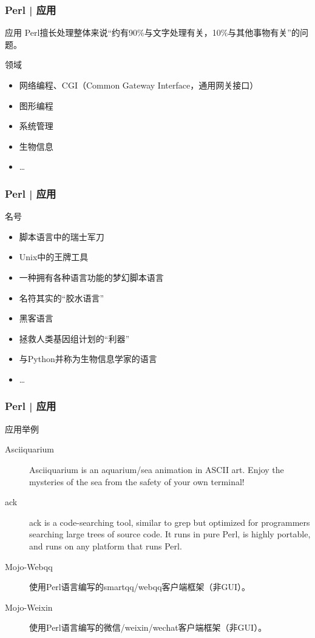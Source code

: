 \begin{frame}
  \frametitle{Perl | 应用}
  \begin{block}{应用}
    Perl擅长处理整体来说“约有90\%与文字处理有关，10\%与其他事物有关”的问题。 
  \end{block}
  \begin{block}{领域}
    \begin{itemize}
      \item 网络编程、CGI（Common Gateway Interface，通用网关接口）
      \item 图形编程
      \item 系统管理
      \item 生物信息
      \item \ldots
    \end{itemize}
  \end{block}
\end{frame}

\begin{frame}
  \frametitle{Perl | 应用}
  \begin{block}{名号}
    \begin{itemize}
      \item 脚本语言中的瑞士军刀
      \item Unix中的王牌工具
      \item 一种拥有各种语言功能的梦幻脚本语言
      \item 名符其实的“胶水语言”
      \item 黑客语言
      \item 拯救人类基因组计划的“利器”
      \item 与Python并称为生物信息学家的语言
      \item \ldots
    \end{itemize}
  \end{block}
\end{frame}

\begin{frame}
  \frametitle{Perl | 应用}
  \begin{block}{应用举例}
    \begin{description}
      \item[\alert{Asciiquarium}] Asciiquarium is an aquarium/sea animation in ASCII art. Enjoy the mysteries of the sea from the safety of your own terminal! 
      \item[\alert{ack}] ack is a code-searching tool, similar to grep but optimized for programmers searching large trees of source code. It runs in pure Perl, is highly portable, and runs on any platform that runs Perl. 
      \item[Mojo-Webqq] 使用Perl语言编写的smartqq/webqq客户端框架（非GUI）。 
      \item[Mojo-Weixin] 使用Perl语言编写的微信/weixin/wechat客户端框架（非GUI）。
    \end{description}
  \end{block}
\end{frame}


